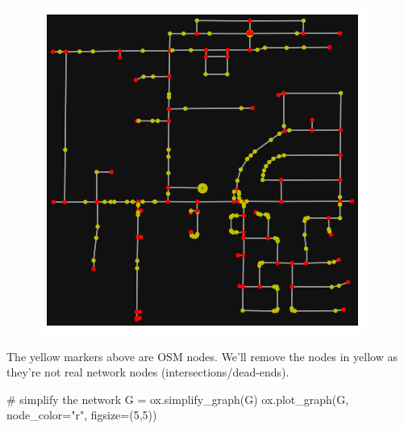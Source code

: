 \documentclass[
  letterpaper,
  DIV=11,
  numbers=noendperiod]{scrreprt}
\newenvironment{Shaded}{\begin{snugshade}}{\end{snugshade}}
\newcommand{\CommentTok}[1]{\textcolor[rgb]{0.37,0.37,0.37}{#1}}
\newcommand{\DecValTok}[1]{\textcolor[rgb]{0.68,0.00,0.00}{#1}}
\newcommand{\NormalTok}[1]{\textcolor[rgb]{0.00,0.23,0.31}{#1}}
\newcommand{\OperatorTok}[1]{\textcolor[rgb]{0.37,0.37,0.37}{#1}}
\newcommand{\StringTok}[1]{\textcolor[rgb]{0.13,0.47,0.30}{#1}}
\begin{document}
\begin{figure}[H]

{\centering \includegraphics{labs/w07_OSM_files/figure-pdf/cell-16-output-1.png}

}

\end{figure}

The yellow markers above are OSM nodes. We'll remove the nodes in yellow
as they're not real network nodes (intersections/dead-ends).

\begin{Shaded}
\begin{Highlighting}[]
\CommentTok{\# simplify the network}
\NormalTok{G }\OperatorTok{=}\NormalTok{ ox.simplify\_graph(G)}
\NormalTok{ox.plot\_graph(G, node\_color}\OperatorTok{=}\StringTok{"r"}\NormalTok{, figsize}\OperatorTok{=}\NormalTok{(}\DecValTok{5}\NormalTok{,}\DecValTok{5}\NormalTok{))}
\end{Highlighting}
\end{Shaded}
\end{document}
